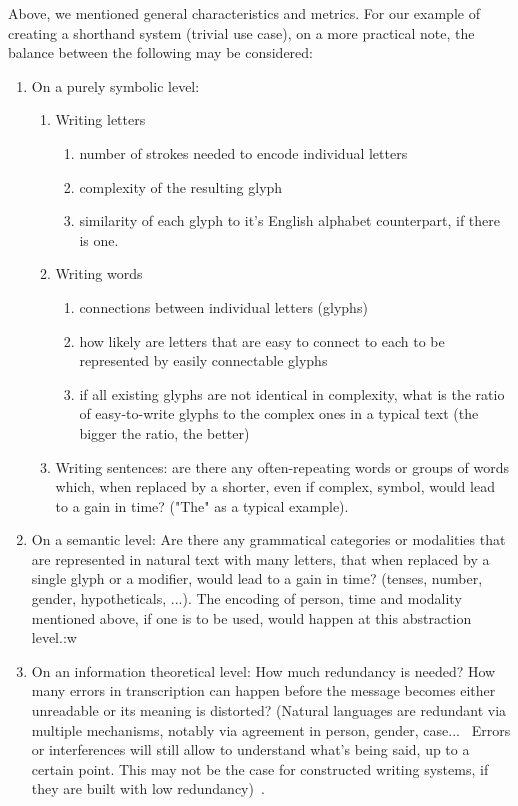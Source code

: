 \documentclass{vgtc}                          %
\begin{document}
Above, we mentioned general characteristics and metrics. For our example of creating a shorthand system (trivial use case), on a more practical note, the balance between the following may be considered:
\begin{enumerate}
        \item On a purely symbolic level:
        \begin{enumerate}
                \item Writing letters
                \begin{enumerate}
                        \item number of strokes needed to encode individual letters
                        \item complexity of the resulting glyph
                        \item similarity of each glyph to it's English alphabet counterpart, if there is one.
                \end{enumerate}
                \item Writing words
                \begin{enumerate}
                        \item connections between individual letters (glyphs)
                        \item how likely are letters that are easy to connect to each to be represented by easily connectable glyphs
                        \item if all existing glyphs are not identical in complexity, what is the ratio of easy-to-write glyphs to the complex ones in a typical text (the bigger the ratio, the better)
                \end{enumerate}
        \item Writing sentences: are there any often-repeating words or groups of words which, when replaced by a shorter, even if complex, symbol, would lead to a gain in time? ("The" as a typical example).
        \end{enumerate}
        \item On a semantic level: Are there any grammatical categories or modalities that are represented in natural text with many letters, that when replaced by a single glyph or a modifier, would lead to a gain in time? (tenses, number, gender, hypotheticals, ...). The encoding of person, time and modality mentioned above, if one is to be used, would happen at this abstraction level.:w
        \item On an information theoretical level: How much redundancy is needed? How many errors in transcription can happen before the message becomes either unreadable or its meaning is distorted?  (Natural languages  are redundant via multiple mechanisms, notably via agreement in person, gender, case...~\cite{bussmann2006routledge} Errors or interferences will still allow to understand what’s being said, up to a certain point. This may not be the case for constructed writing systems, if they are built with low redundancy)~\cite{reza1961introduction}.
\end{enumerate}
\end{document}
